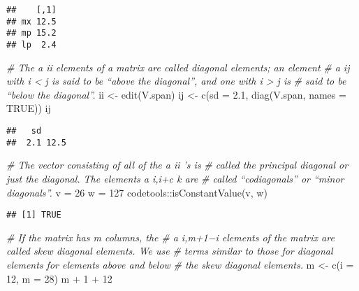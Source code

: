\documentclass[
]{article}
\newenvironment{Shaded}{\begin{snugshade}}{\end{snugshade}}
\newcommand{\AttributeTok}[1]{\textcolor[rgb]{0.77,0.63,0.00}{#1}}
\newcommand{\CommentTok}[1]{\textcolor[rgb]{0.56,0.35,0.01}{\textit{#1}}}
\newcommand{\ConstantTok}[1]{\textcolor[rgb]{0.00,0.00,0.00}{#1}}
\newcommand{\DecValTok}[1]{\textcolor[rgb]{0.00,0.00,0.81}{#1}}
\newcommand{\FloatTok}[1]{\textcolor[rgb]{0.00,0.00,0.81}{#1}}
\newcommand{\FunctionTok}[1]{\textcolor[rgb]{0.00,0.00,0.00}{#1}}
\newcommand{\NormalTok}[1]{#1}
\newcommand{\OtherTok}[1]{\textcolor[rgb]{0.56,0.35,0.01}{#1}}
\newcommand{\SpecialCharTok}[1]{\textcolor[rgb]{0.00,0.00,0.00}{#1}}
\begin{document}
\begin{verbatim}
##    [,1]
## mx 12.5
## mp 15.2
## lp  2.4
\end{verbatim}

\begin{Shaded}
\begin{Highlighting}[]
\CommentTok{\# The a ii elements of a matrix are called diagonal elements; an element}
\CommentTok{\# a ij with i \textless{} j is said to be “above the diagonal”, and one with i \textgreater{} j is}
\CommentTok{\# said to be “below the diagonal”.}
\NormalTok{ii }\OtherTok{\textless{}{-}} \FunctionTok{edit}\NormalTok{(V.span)}
\NormalTok{ij }\OtherTok{\textless{}{-}} \FunctionTok{c}\NormalTok{(}\AttributeTok{sd =} \FloatTok{2.1}\NormalTok{, }\FunctionTok{diag}\NormalTok{(V.span, }\AttributeTok{names =} \ConstantTok{TRUE}\NormalTok{))}
\NormalTok{ij}
\end{Highlighting}
\end{Shaded}

\begin{verbatim}
##   sd      
##  2.1 12.5
\end{verbatim}

\begin{Shaded}
\begin{Highlighting}[]
\CommentTok{\# The vector consisting of all of the a ii ’s is}
\CommentTok{\# called the principal diagonal or just the diagonal. The elements a i,i+c k are}
\CommentTok{\# called “codiagonals” or “minor diagonals”.}
\NormalTok{v }\OtherTok{=} \DecValTok{26}
\NormalTok{w }\OtherTok{=} \DecValTok{127}
\NormalTok{codetools}\SpecialCharTok{::}\FunctionTok{isConstantValue}\NormalTok{(v, w)}
\end{Highlighting}
\end{Shaded}

\begin{verbatim}
## [1] TRUE
\end{verbatim}

\begin{Shaded}
\begin{Highlighting}[]
\CommentTok{\# If the matrix has m columns, the}
\CommentTok{\# a i,m+1−i elements of the matrix are called skew diagonal elements. We use}
\CommentTok{\# terms similar to those for diagonal elements for elements above and below}
\CommentTok{\# the skew diagonal elements.}
\NormalTok{m }\OtherTok{\textless{}{-}} \FunctionTok{c}\NormalTok{(}\AttributeTok{i =} \DecValTok{12}\NormalTok{, }\AttributeTok{m =} \DecValTok{28}\NormalTok{)}
\NormalTok{m }\SpecialCharTok{+} \DecValTok{1} \SpecialCharTok{+} \DecValTok{12}
\end{Highlighting}
\end{Shaded}
\end{document}
